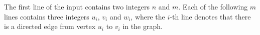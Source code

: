 The first line of the input contains two integers $n$ and $m$.
Each of the following $m$ lines contains three integers $u_i$, $v_i$ and $w_i$, where the $i$-th line denotes that there is a directed edge from vertex $u_i$ to $v_i$ in the graph.